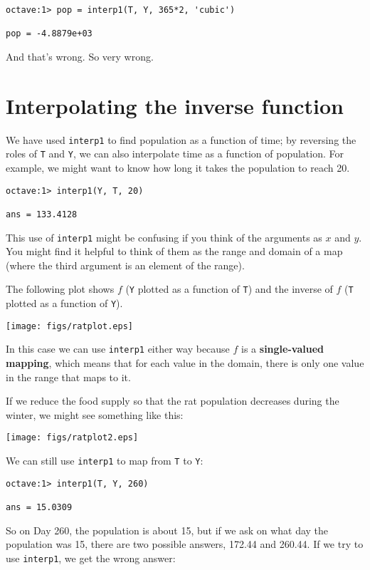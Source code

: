 \begin{verbatim}
octave:1> pop = interp1(T, Y, 365*2, 'cubic')

pop = -4.8879e+03
\end{verbatim}

And that's wrong. So very wrong.


\section{Interpolating the inverse function}

We have used {\tt interp1} to find population as a function of time;
by reversing the roles of {\tt T} and {\tt Y}, we can also interpolate
time as a function of population. For example, we might want to know
how long it takes the population to reach 20.

\begin{verbatim}
octave:1> interp1(Y, T, 20)

ans = 133.4128
\end{verbatim}

This use of {\tt interp1} might be confusing if you think of the
arguments as $x$ and $y$. You might find it helpful to think of them
as the range and domain of a map (where the third argument is
an element of the range).

The following plot shows $f$ ({\tt Y} plotted as a function of {\tt T})
and the inverse of $f$ ({\tt T} plotted as a function of {\tt Y}).

\beforefig
\centerline{\texttt{[image: figs/ratplot.eps]}}

In this case we can use {\tt interp1} either way because $f$ is
a {\bf single-valued mapping}, which means that for each value in
the domain, there is only one value in the range that maps to it.

If we reduce the food supply so that the rat population decreases
during the winter, we might see something like this:

\beforefig 
\centerline{\texttt{[image: figs/ratplot2.eps]}}

We can still use {\tt interp1} to map from {\tt T} to {\tt Y}:

\begin{verbatim}
octave:1> interp1(T, Y, 260)

ans = 15.0309
\end{verbatim}

So on Day 260, the population is about 15, but if we ask on what
day the population was 15, there are two possible answers, 172.44
and 260.44. If we try to use {\tt interp1}, we get the wrong answer:

